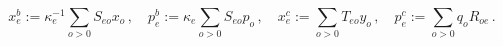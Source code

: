 \begin{equation}
x_{e}^{b}:=\kappa _{e}^{-1}\sum_{o>0}S_{eo}x_{o}\,,\quad p_{e}^{b}:=\kappa
_{e}\sum_{o>0}S_{eo}p_{o}\,,\quad x_{e}^{c}:=\sum_{o>0}T_{eo}y_{o}\,,\quad
p_{e}^{c}:=\sum_{o>0}q_{o}R_{oe}\,.
\end{equation}


